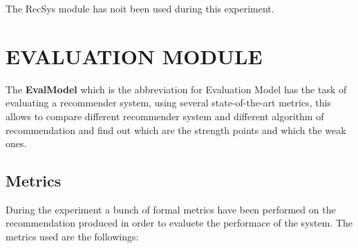 \documentclass[11pt]{article}
\begin{document}
The RecSys module has noit been used during this experiment.
\hfill\break
\hfill\break



\section{EVALUATION MODULE}\label{sec:eva-module}
The \textbf{EvalModel} which is the abbreviation for Evaluation Model has the task of evaluating a recommender system,
using several state-of-the-art metrics, this allows to compare different recommender system and different algorithm of
recommendation and find out which are the strength points and which the weak ones.

\subsection{Metrics}\label{subsec:metrics}
During the experiment a bunch of formal metrics have been performed on the recommendation produced in order to evaluete
the performace of the system.
The metrics used are the followings:
\hfill\break
\hfill\break



\end{document}
